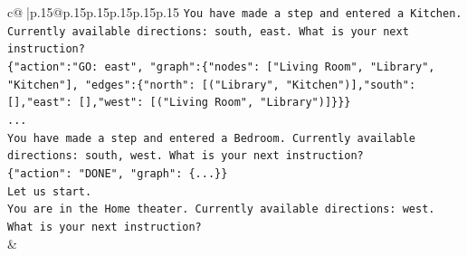 \documentclass{article}
\begin{document}
{\begin{supertabular}{c@{$\;$}|p{.15\linewidth}@{}p{.15\linewidth}p{.15\linewidth}p{.15\linewidth}p{.15\linewidth}p{.15\linewidth}}
{{{\texttt{You have made a step and entered a Kitchen. Currently available directions: south, east. What is your next instruction?} \\
\texttt{\{"action":"GO: east", "graph":\{"nodes": {[}"Living Room", "Library", "Kitchen"{]}, "edges":\{"north": {[}("Library", "Kitchen"){]},"south": {[}{]},"east": {[}{]},"west": {[}("Living Room", "Library"){]}\}\}\}} \\
\texttt{...} \\
\texttt{You have made a step and entered a Bedroom. Currently available directions: south, west. What is your next instruction?} \\
\texttt{\{"action": "DONE", "graph": \{...\}\}} \\
\texttt{Let us start.} \\
\texttt{You are in the Home theater. Currently available directions: west. What is your next instruction?} \\
            }
        }
    }
    & \\ \\


\end{supertabular}}
\end{document}
